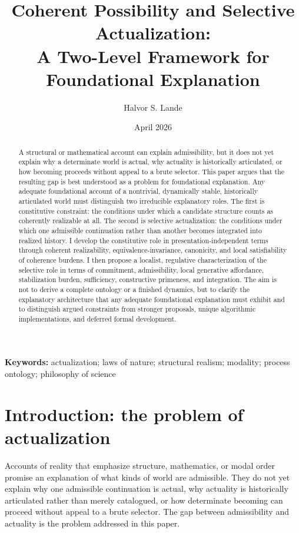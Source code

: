 \documentclass[11pt]{article}
\title{\textcolor{titleblue}{\Large Coherent Possibility and Selective Actualization:}\\[0.35em]\textcolor{titleblue}{\Large A Two-Level Framework for Foundational Explanation}}
\author{Halvor S. Lande}
\date{April 2026}
\theoremstyle{foundation}
\begin{document}
\maketitle

\begin{abstract}
A structural or mathematical account can explain admissibility, but it does not yet explain why a determinate world is actual, why actuality is historically articulated, or how becoming proceeds without appeal to a brute selector. This paper argues that the resulting gap is best understood as a problem for foundational explanation. Any adequate foundational account of a nontrivial, dynamically stable, historically articulated world must distinguish two irreducible explanatory roles. The first is constitutive constraint: the conditions under which a candidate structure counts as coherently realizable at all. The second is selective actualization: the conditions under which one admissible continuation rather than another becomes integrated into realized history. I develop the constitutive role in presentation-independent terms through coherent realizability, equivalence-invariance, canonicity, and local satisfiability of coherence burdens. I then propose a localist, regulative characterization of the selective role in terms of commitment, admissibility, local generative affordance, stabilization burden, sufficiency, constructive primeness, and integration. The aim is not to derive a complete ontology or a finished dynamics, but to clarify the explanatory architecture that any adequate foundational explanation must exhibit and to distinguish argued constraints from stronger proposals, unique algorithmic implementations, and deferred formal development.
\end{abstract}

\noindent\textbf{Keywords:} actualization; laws of nature; structural realism; modality; process ontology; philosophy of science

\section{Introduction: the problem of actualization}

Accounts of reality that emphasize structure, mathematics, or modal order promise an explanation of what kinds of world are admissible. They do not yet explain why one admissible continuation is actual, why actuality is historically articulated rather than merely catalogued, or how determinate becoming can proceed without appeal to a brute selector. The gap between admissibility and actuality is the problem addressed in this paper.
\end{document}

